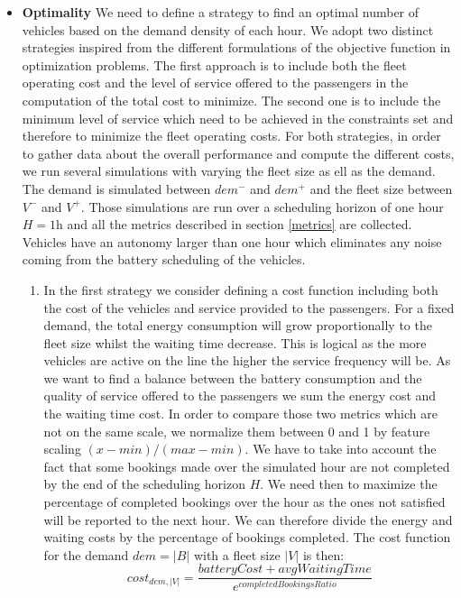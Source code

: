 \documentclass[12pt,a4paper]{article}
\begin{document}
\begin{itemize}
\item \textbf{Optimality} We need to define a strategy to find an optimal number of vehicles based on the demand density of each hour. We adopt two distinct strategies inspired from the different formulations of the objective function in optimization problems. The first approach is to include both the fleet operating cost and the level of service offered to the passengers in the computation of the total cost to minimize. The second one is to include the minimum level of service which need to be achieved in the constraints set and therefore to minimize the fleet operating costs. For both strategies, in order to gather data about the overall performance and compute the different costs, we run several simulations with varying the fleet size as ell as the demand. The demand is simulated between $dem^{-}$ and $dem^{+}$ and the fleet size between $V^{-}$ and $V^{+}$. Those simulations are run over a scheduling horizon of one hour $H = 1$h and all the metrics described in section \ref{metrics} are collected. Vehicles have an autonomy larger than one hour which eliminates any noise coming from the battery scheduling of the vehicles. 
\begin{enumerate}
\setlength\itemsep{1pt} 
\item In the first strategy we consider defining a cost function including both the cost of the vehicles and service provided to the passengers. For a fixed demand, the total energy consumption will grow proportionally to the fleet size whilst the waiting time decrease. This is logical as the more vehicles are active on the line the higher the service frequency will be. As we want to find a balance between the battery consumption and the quality of service offered to the passengers we sum the energy cost and the waiting time cost. In order to compare those two metrics which are not on the same scale, we normalize them between 0 and 1 by feature scaling $(x-min)/(max-min)$. We have to take into account the fact that some bookings made over the simulated hour are not completed by the end of the scheduling horizon $H$. We need then to maximize the percentage of completed bookings over the hour as the ones not satisfied will be reported to the next hour. We can therefore divide the energy and waiting costs by the percentage of bookings completed. The cost function for the demand $dem = |B|$ with a fleet size $|V|$ is then:
\begin{equation} \label{costfunction}
cost_{dem, |V|} = \frac{batteryCost + avgWaitingTime}{e^{completedBookingsRatio}}

\end{equation}
\end{enumerate}
\end{itemize}
\end{document}
